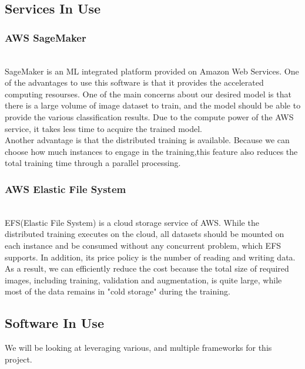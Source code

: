 \documentclass[conference]{IEEEtran}
\begin{document}
\subsection{Services In Use}
\subsubsection{AWS SageMaker}~\\
SageMaker is an ML integrated platform provided on Amazon Web Services. One of the advantages to use this software is that it provides the accelerated computing resourses. One of the main concerns about our desired model is that there is a large volume of image dataset to train, and the model should be able to provide the various classification results. Due to the compute power of the AWS service, it takes less time to acquire the trained model.\\
Another advantage is that the distributed training is available. Because we can choose how much instances to engage in the training,this feature also reduces the total training time through a parallel processing.
\newline
\subsubsection{AWS Elastic File System}~\\
EFS(Elastic File System) is a cloud storage service of AWS. While the distributed training executes on the cloud, all datasets should be mounted on each instance and be consumed without any concurrent problem, which EFS supports. In addition, its price policy is the number of reading and writing data. As a result, we can efficiently reduce the cost because the total size of required images, including training, validation and augmentation, is quite large, while most of the data remains in "cold storage" during the training.
\newline

\subsection{Software In Use}
We will be looking at leveraging various, and multiple frameworks for this project.\\
\end{document}
